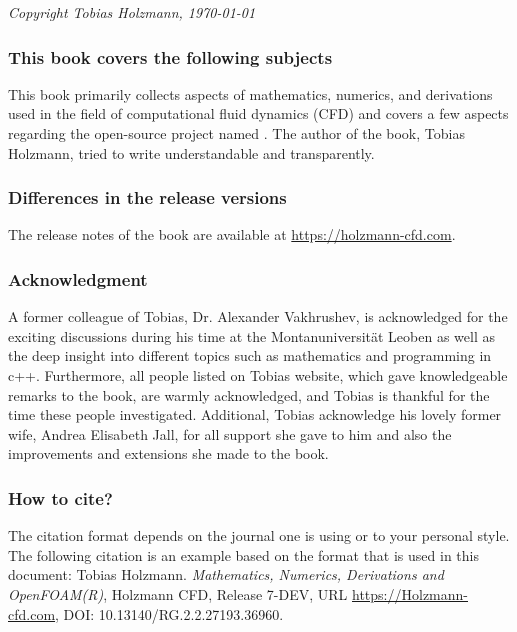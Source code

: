 \documentclass[MathematicsNumericsDerivationsAndOpenFOAM.tex]{subfiles}
\begin{document}
%
%
\textit{Copyright Tobias Holzmann, \today}
%
%
\vspace{1cm}



\subsubsection*{This book covers the following subjects}
%
%
%
%
    This book primarily collects aspects of mathematics, numerics, and
    derivations used in the field of computational fluid dynamics (CFD) and
    covers a few aspects regarding the open-source project named \OF.
    The author of the book, Tobias Holzmann, tried to write understandable and
    transparently.
%
%
%
%
%
\subsubsection*{Differences in the release versions}
%
%
	The release notes of the book are available at \url{https://holzmann-cfd.com}.
%
%
%
%
\subsubsection*{Acknowledgment}
%
%
%
%
    A former colleague of Tobias, Dr. Alexander Vakhrushev, is acknowledged for
    the exciting discussions during his time at the Montanuniversität Leoben
    as well as the deep insight into different topics such as mathematics and
    programming in c++. Furthermore, all people listed on Tobias website, which
    gave knowledgeable remarks to the book, are warmly acknowledged, and Tobias
    is thankful for the time these people investigated. Additional, Tobias
    acknowledge his lovely former wife, Andrea Elisabeth Jall, for all support
    she gave to him and also the improvements and extensions she made to the book.
%
%
%

\subsubsection*{How to cite?}
%
%
    The citation format depends on the journal one is using or to your personal
    style. The following citation is an example based on the format that
    is used in this document:
    \vspace{0.5cm}
%
%
\newline
%
%
%
    Tobias Holzmann. \textit{Mathematics, Numerics, Derivations and OpenFOAM(R)},
    Holzmann CFD, Release 7-DEV, URL \url{https://Holzmann-cfd.com},
    DOI: 10.13140/RG.2.2.27193.36960.
\end{document}
